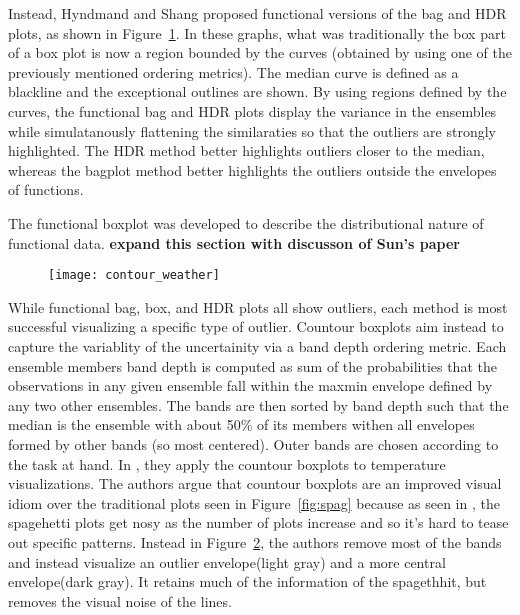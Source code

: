\documentclass[../main.tex]{subfiles}
\begin{document}
\begin{figure}
\label{fig:funcbag}
\end{figure}
Instead, Hyndmand and Shang proposed functional versions of the bag and HDR
plots\cite{hyndman2009}, as shown in Figure~\ref{fig:funcbag}. In these graphs,
what was traditionally the box part of a box plot is now a region bounded by
the curves (obtained by using one of the previously mentioned ordering
metrics). The median curve is defined as a blackline and the exceptional
outlines are shown. By using regions defined by the curves, the functional bag
and HDR plots display the variance in the ensembles while simulatanously
flattening the similaraties so that the outliers are strongly highlighted. The
HDR method better highlights outliers closer to the median, whereas the bagplot
method better highlights the outliers outside the envelopes of functions. 



The functional boxplot was developed to describe the distributional nature of
functional data\cite{sun2011}. \textbf{expand this section with discusson of Sun's paper}


\begin{figure}
  \texttt{[image: contour\_weather]}
  \caption{}
\label{fig:countour}
\end{figure}
While functional bag, box, and HDR plots all show outliers, each method is most
successful visualizing a specific type of outlier. Countour
boxplots\cite{whitaker2013} aim instead to capture the variablity of the
uncertainity via a band depth ordering metric. Each ensemble members band depth
is computed as sum of the probabilities that the observations in any given
ensemble fall within the max\-min envelope defined by any two other
ensembles. The bands are then sorted by band depth such that the median is the
ensemble with about 50\% of its members withen all envelopes formed by other
bands (so most centered). Outer bands are chosen according to the task at
hand. In \cite{whitaker2013}, they apply the countour boxplots to temperature
visualizations. The authors argue that countour boxplots are an improved visual
idiom over the traditional plots seen in Figure~\ref{fig:spag} because
as seen in , the spagehetti plots get nosy as the number of plots increase
and so it's hard to tease out specific patterns. Instead in Figure~\ref{fig:countour}, the authors
remove most of the bands and instead visualize an outlier envelope(light gray)
and a more central envelope(dark gray). It retains much of the information of
the spagethhit, but removes the visual noise of the lines.
\end{document}
